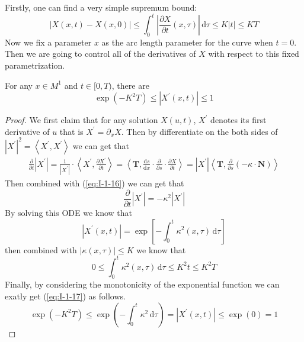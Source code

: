Firstly, one can find a very simple supremum bound:
\begin{equation*}
    \left|X(x,t)-X(x,0)\right|\le\int_{0}^{t}\left|\frac{\partial X}{\partial t}(x,\tau)\right|\,\mathrm{d}\tau\le K\left|t\right|\le KT
\end{equation*}
Now we fix a parameter $x$ as the arc length parameter for the curve when $t=0$. Then we are going to control all of the derivatives of $X$ with respect to this fixed parametrization.
\begin{lemma}\label{lem:I-1-9}
    For any $x\in M^1$ and $t\in[0,T)$, there are
    \begin{equation}\label{eq:I-1-17}
        \exp{\left(-K^2 T\right)}\le\left|X^\prime(x,t)\right|\le 1
    \end{equation}
\end{lemma}
\begin{proof}
    We first claim that for any solution $X(u,t)$, $X^{\prime}$ denotes its first derivative of $u$ that is $X^\prime=\partial_x X$. Then by differentiate on the both sides of ${\left|X^\prime\right|}^2=\left<X^\prime,X^\prime\right>$ we can get that
    \begin{align*}
        \frac{\partial}{\partial t}\left|X^\prime\right|=\frac{1}{\left|X^\prime\right|}\cdot\left<X^\prime,\frac{\partial X^\prime}{\partial t}\right>=\left<\mathbf{T},\frac{\mathrm{d}s}{\mathrm{d}x}\cdot\frac{\partial}{\partial s}\cdot\frac{\partial X}{\partial t}\right>={\left|X^\prime\right|}\left<\mathbf{T},\frac{\partial}{\partial s}\left(-\kappa\cdot\mathbf{N}\right)\right>
    \end{align*}
    Then combined with (\ref{eq:I-1-16}) we can get that
    \begin{equation*}
        \frac{\partial}{\partial t}\left|X^\prime\right|=-\kappa^2\left|X^\prime\right|
    \end{equation*}
    By solving this ODE we know that
    \begin{equation*}
        \left|X^\prime(x,t)\right|=\exp{\left[-\int_{0}^{t}\kappa^2(x,\tau)\,\mathrm{d}\tau\right]}
    \end{equation*}
    then combined with $\left|\kappa(x,\tau)\right|\le K$ we know that
    \begin{equation*}
        0\le\int_{0}^{t}\kappa^2(x,\tau)\,\mathrm{d}\tau\le K^2 t\le K^2 T
    \end{equation*}
    Finally, by considering the monotonicity of the exponential function we can exatly get (\ref{eq:I-1-17}) as follows.
    \begin{equation*}
        \exp{\left(-K^2 T\right)}\le\exp{\left(-\int_{0}^{t}\kappa^2\,\mathrm{d}\tau\right)}=\left|X^\prime(x,t)\right|\le\exp{(0)}=1
    \end{equation*}
\end{proof}

